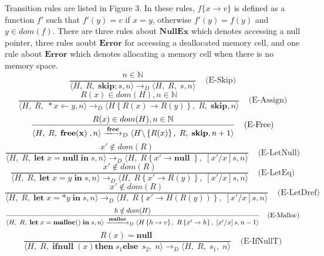 \documentclass[english]{jssst_ppl} %
\newcommand\LET{\mathbf{let}\;}
\newcommand\FREE{\mathbf{free(x)}\;}
\newcommand\IN{\mathbf{in}\;}
\newcommand\SKIP{\mathbf{skip}}
\newcommand\Rtab{\; \; \; \;}
\newcommand\NULL{\mathbf{null}\;}
\newcommand\IFNULL{\mathbf{ifnull}\;}
\newcommand\THEN{\mathbf{then}\;}
\newcommand\ELSE{\mathbf{else}\;}
\newcommand\Lfc{\left\{}
\newcommand\Rfc{\right\}}
\newcommand\Lb{\left[}
\newcommand\Rb{\right]}
\newcommand\coma{,\;}
\newcommand\Malloc{\mathbf{malloc}}
\newcommand\Free{\mathbf{free}}
\newcommand\Cirx{(x)}
\begin{document}
Transition rules are listed in Figure 3. In these rules, $f\{x\to v\}$ is defined as a function $f'$ such that $f'(y) = v$ if $x = y$, otherwise $f'(y) = f(y)$ and $y \in dom(f)$. There are three rules about $\mathbf{NullEx}$ which denotes accessing a null pointer, three rules aoubt $\mathbf{Error}$ for accessing a deallocated memory cell, and one rule about $\mathbf{Error}$ which denotes allocating a memory cell when there is no memory space.
$$
    \frac{n \in \mathbb{N}}
            {\langle H\coma R\coma  \SKIP;s , n \rangle
              \longrightarrow_{D}
                \langle H\coma R\coma   s , n \rangle }
     \Rtab \mbox{(E-Skip)}
$$
$$
     \frac{R(x) \in dom(H), n \in \mathbb{N}}
           {\langle H\coma R\coma  *x \leftarrow y , n \rangle
             \longrightarrow_{D}
             \langle H \Lfc R(x) \rightarrow R(y) \Rfc \coma R \coma   \SKIP , n  \rangle }
     \Rtab \mbox{(E-Assign)}
$$
$$
     \frac{R(x) \in dom(H) , n \in \mathbb{N}}
          {\langle H\coma R\coma  \FREE , n \rangle
            \xlongrightarrow{\Free}_{D}
            \langle H\backslash \Lfc R(x) \Rfc \coma R \coma   \SKIP , n+1  \rangle }
     \Rtab \mbox{(E-Free)}
$$
$$
     \frac{x' \notin dom(R)}
           {\langle H\coma R\coma  \LET x = \NULL \IN s , n \rangle
             \longrightarrow_{D}
             \langle H\coma R\Lfc x' \rightarrow \NULL \Rfc \coma   \Lb x'/x \Rb s , n  \rangle }
     \Rtab \mbox{(E-LetNull)}
$$
$$
     \frac{x' \notin dom(R)}
            {\langle H\coma R\coma \LET x = y \; \IN s , n \rangle
              \longrightarrow_{D}
              \langle H\coma R\Lfc x' \rightarrow R(y) \Rfc \coma   \Lb x'/x \Rb s , n  \rangle }
\Rtab \mbox{(E-LetEq)}
$$
$$
     \frac{x' \notin dom(R)}
            {\langle H\coma R\coma  \LET x = *y \; \IN s , n \rangle
              \longrightarrow_{D}
              \langle H\coma R\Lfc x' \rightarrow H(R(y)) \Rfc \coma   \Lb x'/x \Rb s , n  \rangle }
     \Rtab \mbox{(E-LetDref)}
$$
$$
     \frac{h \notin dom(H)}
            {\langle H\coma R\coma  \LET x = \Malloc() \; \IN s , n \rangle
              \xlongrightarrow{\Malloc}_{D}
              \langle H \Lfc h \rightarrow v\Rfc \coma R\Lfc x' \rightarrow h \Rfc \coma   \Lb x'/x \Rb s , n-1  \rangle }
\Rtab \mbox{(E-Malloc)}
$$
$$
    \frac{R(x) = \NULL}
           {\langle H \coma R \coma \IFNULL\Cirx   \THEN   s_{1} \ELSE\  s_{2} \coma  n \rangle
           \longrightarrow_{D}
           \langle H\coma R\coma s_{1} \coma n \rangle}
    \Rtab \mbox{(E-IfNullT)}
$$
\end{document}
